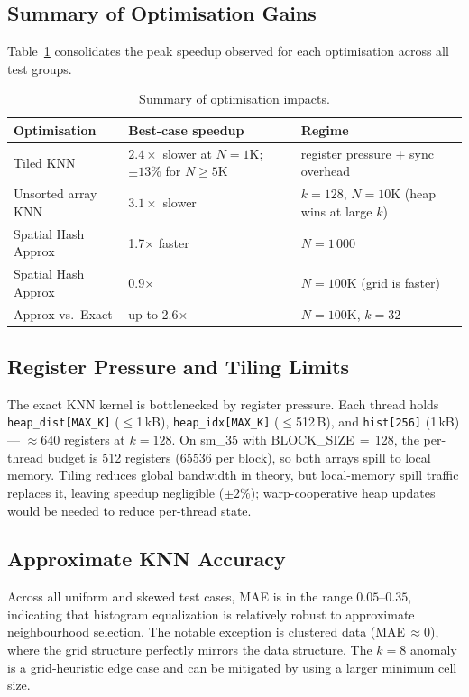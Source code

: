 \documentclass[11pt,a4paper]{article}
\begin{document}
\subsection{Summary of Optimisation Gains}

Table~\ref{tab:summary} consolidates the peak speedup observed for each
optimisation across all test groups.

\begin{table}[H]
\centering
\caption{Summary of optimisation impacts.}
\label{tab:summary}
\begin{tabular}{llp{4.5cm}}
\toprule
Optimisation & Best-case speedup & Regime \\
\midrule
Tiled KNN            & $2.4\times$ slower at $N=1\text{K}$; $\pm13\%$ for $N\ge5\text{K}$ & register pressure + sync overhead \\
Unsorted array KNN   & $3.1\times$ slower & $k=128$, $N=10\text{K}$ (heap wins at large $k$) \\
Spatial Hash Approx  & 1.7$\times$ faster  & $N=1\,000$ \\
Spatial Hash Approx  & 0.9$\times$         & $N=100\text{K}$ (grid is faster) \\
Approx vs.\ Exact    & up to 2.6$\times$   & $N=100\text{K}$, $k=32$ \\
\bottomrule
\end{tabular}
\end{table}

\subsection{Register Pressure and Tiling Limits}

The exact KNN kernel is bottlenecked by register pressure.  Each thread holds
\texttt{heap\_dist[MAX\_K]} ($\le$1\,kB), \texttt{heap\_idx[MAX\_K]} ($\le$512\,B),
and \texttt{hist[256]} (1\,kB) --- $\approx$640 registers at $k=128$.  On
sm\_35 with BLOCK\_SIZE$\,=\,$128, the per-thread budget is 512 registers
(65536 per block), so both arrays spill to local memory.  Tiling reduces global
bandwidth in theory, but local-memory spill traffic replaces it, leaving
speedup negligible ($\pm2\%$); warp-cooperative heap updates would be needed to
reduce per-thread state.

\subsection{Approximate KNN Accuracy}

Across all uniform and skewed test cases, MAE is in the range $0.05$--$0.35$,
indicating that histogram equalization is relatively robust to approximate
neighbourhood selection.  The notable exception is clustered data (MAE\,$\approx
0$), where the grid structure perfectly mirrors the data structure.  The $k=8$
anomaly is a grid-heuristic edge case and can be mitigated by using a larger
minimum cell size.
\end{document}

